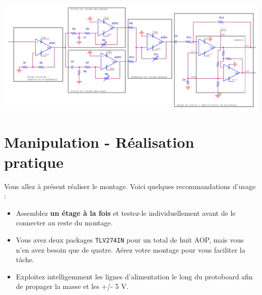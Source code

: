 \documentclass{../template/labo}
\begin{document}
\begin{minipage}{.7\textwidth}
\begin{center}
\includegraphics[width=26cm, angle=90]{figures/montage_complet.png}
\end{center}
\end{minipage}
\begin{minipage}{.25\textwidth}
\begin{center}
\end{center}
\end{minipage}


\section{Manipulation - Réalisation pratique}
Vous allez à présent réaliser le montage. Voici quelques recommandations d'usage :
\begin{itemize}
	\item Assemblez \textbf{un étage à la fois} et testez-le individuellement avant de le connecter au reste du montage.
	\item Vous avez deux packages \texttt{TLV274IN} pour un total de huit AOP, mais vous n'en avez besoin que de quatre. Aérez votre montage pour vous faciliter la tâche.
	\item Exploitez intelligemment les lignes d'alimentation le long du protoboard afin de propager la masse et les +/- 5 V.
\end{itemize}
\end{document}
